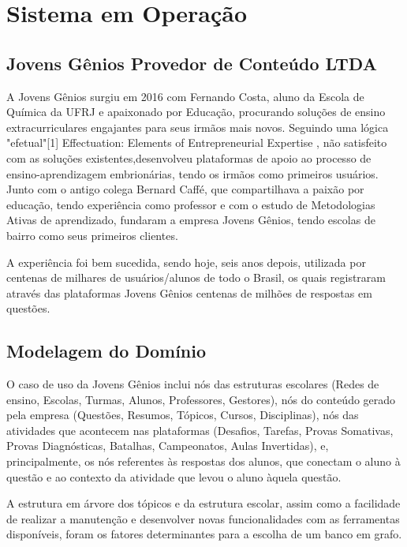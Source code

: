 \chapter{Sistema em Operação}
\label{chap5}


\section{Jovens Gênios Provedor de Conteúdo LTDA}

A Jovens Gênios surgiu em 2016 com Fernando Costa, aluno da Escola de Química da UFRJ e apaixonado por Educação, procurando soluções de ensino extracurriculares engajantes para seus irmãos mais novos. Seguindo uma lógica "efetual"[1] 
Effectuation: Elements of Entrepreneurial Expertise
, não satisfeito com as soluções existentes,desenvolveu plataformas de apoio ao processo de ensino-aprendizagem embrionárias, tendo os irmãos como primeiros usuários.
Junto com o antigo colega Bernard Caffé, que compartilhava a paixão por educação, tendo experiência como professor e com o estudo de Metodologias Ativas de aprendizado, fundaram a empresa Jovens Gênios, tendo escolas de bairro como seus primeiros clientes.

A experiência foi bem sucedida, sendo hoje, seis anos depois, utilizada por centenas de milhares de usuários/alunos de todo o Brasil, os quais registraram através das plataformas Jovens Gênios centenas de milhões de respostas em questões.

\section{Modelagem do Domínio}

O caso de uso da Jovens Gênios inclui nós das estruturas escolares (Redes de ensino, Escolas, Turmas, Alunos, Professores, Gestores), nós do conteúdo gerado pela empresa (Questões, Resumos, Tópicos, Cursos, Disciplinas), nós das atividades que acontecem nas plataformas (Desafios, Tarefas, Provas Somativas, Provas Diagnósticas, Batalhas, Campeonatos, Aulas Invertidas), e, principalmente, os nós referentes às respostas dos alunos, que conectam o aluno à questão e ao contexto da atividade que levou o aluno àquela questão.

A estrutura em árvore dos tópicos e da estrutura escolar, assim como a facilidade de realizar a manutenção e desenvolver novas funcionalidades com as ferramentas disponíveis, foram os fatores determinantes para a escolha de um banco em grafo.

